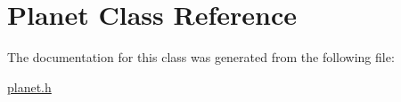 \hypertarget{classPlanet}{}\section{Planet Class Reference}
\label{classPlanet}


The documentation for this class was generated from the following file\+:\begin{DoxyCompactItemize}
\item 
\mbox{\hyperlink{planet_8h}{planet.\+h}}\end{DoxyCompactItemize}

